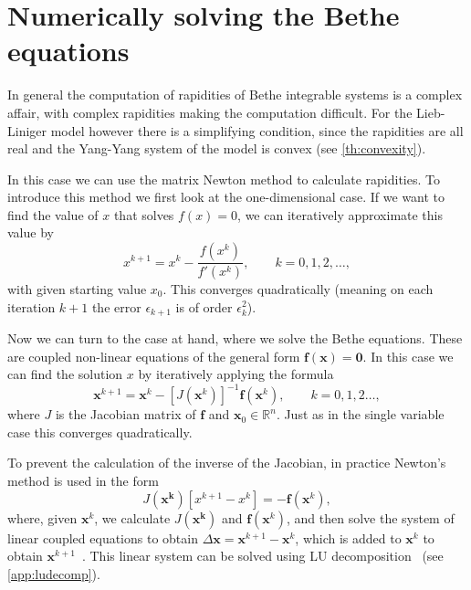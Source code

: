 \documentclass[11pt, a4paper]{report} %
\begin{document}
\section{Numerically solving the Bethe equations}\label{sec:numer-solv-bethe}

In general the computation of rapidities of Bethe integrable systems is a complex affair, with complex rapidities making the computation difficult.
For the Lieb-Liniger model however there is a simplifying condition, since the rapidities are all real and the Yang-Yang system of the model is convex (see \cref{th:convexity}).

In this case we can use the matrix Newton method to calculate rapidities.
To introduce this method we first look at the one-dimensional case.
If we want to find the value of \(x\) that solves \(f(x)=0\), we can iteratively approximate this value by 
\begin{equation}
  x^{k+1} = x^k - \frac{f(x^k)}{f'(x^k)}, \qquad k = 0, 1, 2, \ldots,
\end{equation}
with given starting value \(x_0\).
This converges quadratically (meaning on each iteration \(k+1\) the error \(\epsilon_{k+1}\) is of order \(\epsilon_k^2\)).

Now we can turn to the case at hand, where we solve the Bethe equations.
These are coupled non-linear equations of the general form \(\mathbf{f(x)=0}\).
In this case we can find the solution \(x\) by iteratively applying the formula
\begin{equation}
  \mathbf{x}^{k+1} = \mathbf{x}^k - {[J(\mathbf{x}^k)]}^{-1}\mathbf{f}(\mathbf{x}^k), \qquad k=0,1,2\ldots,
\end{equation}
where \(J\) is the Jacobian matrix of \(\mathbf{f}\) and \(\mathbf{x}_0 \in \mathbb{R}^n\).
Just as in the single variable case this converges quadratically.

To prevent the calculation of the inverse of the Jacobian, in practice Newton's method is used in the form
\begin{equation}\label{eq:practicalnewton}
  J(\mathbf{x^k})[x^{k+1} - x^k] = - \mathbf{f}(\mathbf{x}^k),
\end{equation}
where, given \(\mathbf{x}^k\), we calculate \(J(\mathbf{x^k})\) and \( \mathbf{f}(\mathbf{x}^k)\), and then solve the system of linear coupled equations to obtain \(\Delta\mathbf{x}=\mathbf{x}^{k+1} - \mathbf{x}^k\), which is added to \(\mathbf{x}^k\) to obtain \(\mathbf{x}^{k+1}\)~\cite{Sueli2003}. 
This linear system can be solved using LU decomposition~\cite{Press2007} (see \cref{app:ludecomp}).
\end{document}
